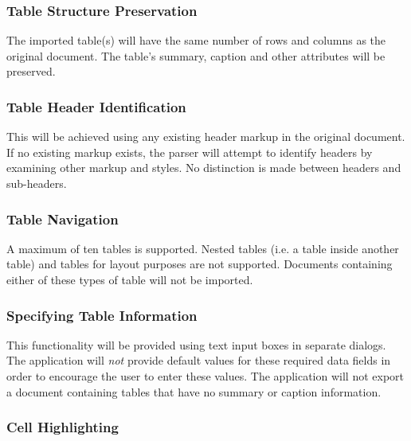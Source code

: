 \subsubsection{Table Structure Preservation}

 The imported table(s) will have the same number of
rows and columns as the original document. The table's summary, caption and
other attributes will be preserved.

\subsubsection{Table Header Identification}

 This will be achieved using any existing header markup in
the original document. If no existing markup exists, the parser will attempt to
identify headers by examining other markup and styles. No distinction is made
between headers and sub-headers.

\subsubsection{Table Navigation}

 A maximum of ten tables is
supported. Nested tables (i.e. a table inside another table) and tables for
layout purposes are not supported. Documents containing either of these types
of table will not be imported.

\subsubsection{Specifying Table Information}

 This functionality will be provided using text
input boxes in separate dialogs. The application will \emph{not} provide
default values for these required data fields in order to encourage the user to
enter these values. The application will not export a document containing
tables that have no summary or caption information.

\subsubsection{Cell Highlighting}

